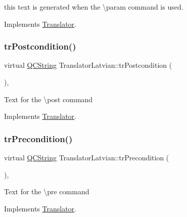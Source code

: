 this text is generated when the \textbackslash{}param command is used. 

Implements \mbox{\hyperlink{class_translator}{Translator}}.

\mbox{\label{class_translator_latvian_a91fa8a89b0d70595da0c75fd23b31f16}} 
\subsubsection{\texorpdfstring{trPostcondition()}{trPostcondition()}}
{\footnotesize\ttfamily virtual \mbox{\hyperlink{class_q_c_string}{Q\+C\+String}} Translator\+Latvian\+::tr\+Postcondition (\begin{DoxyParamCaption}{ }\end{DoxyParamCaption})\hspace{0.3cm}{\ttfamily [inline]}, {\ttfamily [virtual]}}

Text for the \textbackslash{}post command 

Implements \mbox{\hyperlink{class_translator}{Translator}}.

\mbox{\label{class_translator_latvian_aba7b76d7af873ff097bcc7cc8e7c7555}} 
\subsubsection{\texorpdfstring{trPrecondition()}{trPrecondition()}}
{\footnotesize\ttfamily virtual \mbox{\hyperlink{class_q_c_string}{Q\+C\+String}} Translator\+Latvian\+::tr\+Precondition (\begin{DoxyParamCaption}{ }\end{DoxyParamCaption})\hspace{0.3cm}{\ttfamily [inline]}, {\ttfamily [virtual]}}

Text for the \textbackslash{}pre command 

Implements \mbox{\hyperlink{class_translator}{Translator}}.

\mbox{\label{class_translator_latvian_a434581e902c35c53a8b95705b920ca8b}} 
